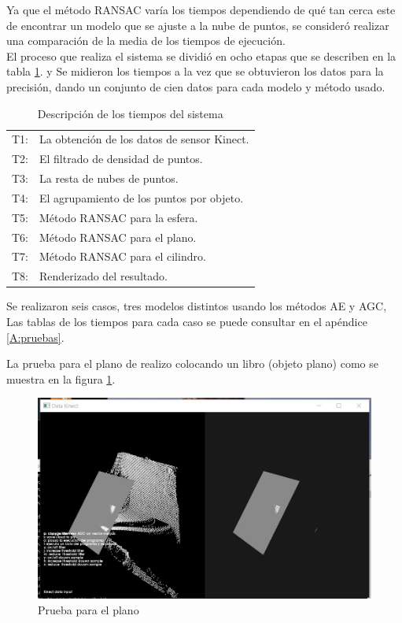 	 
	 
	
	Ya que el método RANSAC varía los tiempos dependiendo de qué tan cerca este de encontrar un modelo que se ajuste a la nube de puntos, se consideró realizar una comparación de la media de los tiempos de ejecución.\\
	
	 El proceso que realiza el sistema se dividió en ocho etapas que se describen en la tabla \ref{tab:DefTiempos}. y Se midieron los tiempos a la vez que se obtuvieron los datos para la precisión, dando un conjunto de cien datos para cada modelo y método usado.
	
	\begin{table}[!htb]
		\caption{Descripción de los tiempos del sistema}
		\centering
		\begin{tabular}{ll}
		\hline
		 T1:& La obtención de los datos de sensor Kinect.\\
		 T2:& El filtrado de densidad de puntos.\\
		 T3:& La resta de nubes de puntos.\\
		 T4:& El agrupamiento de los puntos por objeto.\\
		 T5:& Método RANSAC para la esfera.\\
		 T6:& Método RANSAC para el plano.\\
		 T7:& Método RANSAC para el cilindro.\\
		 T8:& Renderizado del resultado.\\
		
		\hline
	\end{tabular}
\label{tab:DefTiempos}
\end{table}
	
	Se realizaron seis casos, tres modelos distintos usando los métodos AE y AGC, Las tablas de los tiempos para cada caso se puede consultar en el apéndice \ref{A:pruebas}.
	


La prueba para el \gls{plano} de realizo colocando un libro (objeto plano) como se muestra en la figura \ref{fig:pruebaPla}.


\begin{figure}[!htb] 
	\centering
	\includegraphics[width=1\textwidth]{03Resultados/imagenes/plano.JPG}
	\caption{Prueba para el plano} 
	\label{fig:pruebaPla}
\end{figure}


